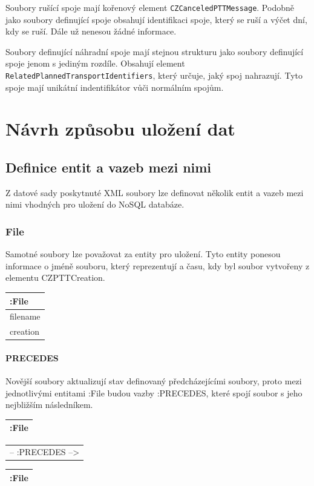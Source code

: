 \documentclass[10pt,xcolor=pdflatex,dvipsnames,table,oneside]{book}
\begin{document}
Soubory rušící spoje mají kořenový element \verb|CZCanceledPTTMessage|. Podobně jako soubory definující spoje obsahují identifikaci spoje, který se ruší
a výčet dní, kdy se ruší. Dále už nenesou žádné informace.

Soubory definující náhradní spoje mají stejnou strukturu jako soubory definující spoje jenom s jediným rozdíle. Obsahují element
\verb|RelatedPlannedTransportIdentifiers|, který určuje, jaký spoj nahrazují. Tyto spoje mají unikátní indentifikátor vůči
normálním spojům.

\chapter{Návrh způsobu uložení dat}
\section{Definice entit a vazeb mezi nimi}
Z datové sady poskytnuté XML soubory lze definovat několik entit a vazeb mezi nimi vhodných pro uložení do NoSQL databáze.
\subsection{File}
Samotné soubory lze považovat za entity pro uložení. Tyto entity ponesou informace o jméně souboru,
který reprezentují a času, kdy byl soubor vytvořeny z elementu CZPTTCreation.

\vspace{1em}
\begin{tabular}{|l|}
    \hline
    :File \\
    \hline
    filename \\
    creation \\
    \hline
\end{tabular}

\subsubsection{PRECEDES}
Novější soubory aktualizují stav definovaný předcházejícími soubory, proto mezi jednotlivými entitami :File
budou vazby :PRECEDES, které spojí soubor s jeho nejbližším následníkem.

\vspace{1em}
\begin{tabular}{|l|}
    \hline
    :File \\
    \hline
\end{tabular}
\begin{tabular}{c}
    -- :PRECEDES --> \\
\end{tabular}
\begin{tabular}{|l|}
    \hline
    :File \\
    \hline
\end{tabular}
\end{document}
